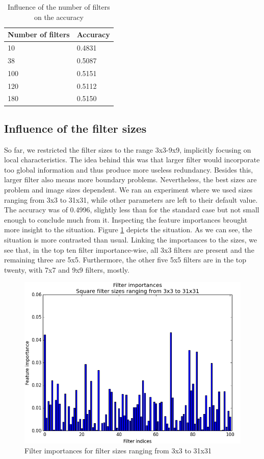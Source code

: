 \documentclass[a4paper]{report}
\newlength{\larg}
\begin{document}
	\begin{table}
		\centering
			\begin{tabular}{l|l}
			\hline
			Number of filters & Accuracy \\
			\hline \hline
			10  & 0.4831 \\
			38 & 0.5087 \\
			100 & 0.5151 \\
			120 & 0.5112 \\
			180 & 0.5150 \\
			\hline
			\end{tabular}
		\caption{\label{tab:AccFNbFilt}Influence of the number of filters on the accuracy}
	\end{table}
	
	
	\subsection{Influence of the filter sizes}
	So far, we restricted the filter sizes to the range 3x3-9x9, implicitly focusing on local characteristics. The idea behind this was that larger filter would incorporate too global information and thus produce more useless redundancy. Besides this, larger filter also means more boundary problems. Nevertheless, the best sizes are problem and image sizes dependent. 
	We ran an experiment where we used sizes ranging from 3x3 to 31x31, while other parameters are left to their default value. The accuracy was of 0.4996, slightly less than for the standard case but not small enough to conclude much from it. Inspecting the feature importances brought more insight to the situation. Figure \ref{fig:FIBigFilters} depicts the situation. As we can see, the situation is more contrasted than usual. Linking the importances to  the sizes, we see that, in the top ten filter importance-wise, all 3x3 filters are present and the remaining three are 5x5. Furthermore, the other five 5x5 filters are in the top twenty, with 7x7 and 9x9 filters, mostly.
	
	\begin{figure}
		\centering
			\includegraphics[width=1.0\textwidth]{images/FIBigFilters.png}
		\caption{\label{fig:FIBigFilters}Filter importances for filter sizes ranging from 3x3 to 31x31}
	\end{figure}
	
\end{document}
